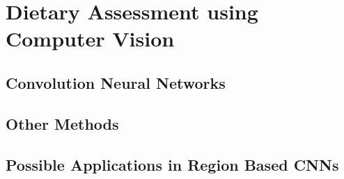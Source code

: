 \section{Dietary Assessment using Computer Vision}
\subsection*{Convolution Neural Networks}


\subsection*{Other Methods}

\subsection*{Possible Applications in Region Based CNNs}
